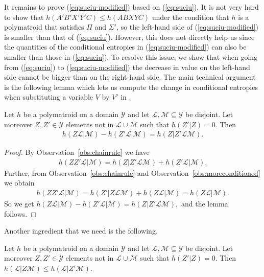 \documentclass[a4paper,cleveref]{lipics-v2021}
\newcommand{\vset}[1]{\mathcal{#1}}
\begin{document}
It remains to prove (\ref{eq:suciu-modified}) based on  (\ref{eq:suciu}). 
It is not very hard to show that $h(A'B'X'Y'C)\le h(ABXYC)$ under the condition that $h$ is a polymatroid that satisfies $\Pi$ and $\Sigma'$, so the left-hand side of (\ref{eq:suciu-modified}) is smaller than that of (\ref{eq:suciu}). 
However, this does not directly help us since the quantities of the conditional entropies in (\ref{eq:suciu-modified}) can also be smaller than those in (\ref{eq:suciu}). 
To resolve this issue, we show that when going from (\ref{eq:suciu}) to (\ref{eq:suciu-modified}) the decrease in  value on the left-hand side cannot be bigger than on the right-hand side.  
The main technical argument is the following lemma which lets us compute the change in conditional entropies when substituting a variable $V$ by $V'$ in .


\begin{lemma}\label{lem:Atoa}
	Let $h$ be a polymatroid on a domain $\vset Y$ and let $\vset L, \vset M\subseteq \vset Y$ be disjoint. 
	Let moreover $Z, Z'\in \vset Y$ elements not in $\vset L\cup \vset M$ such that $h(Z'|Z) = 0$. Then 
	\begin{align*}
	h(Z\vset L|\vset M) - h(Z'\vset L|\vset M) = h(Z |  Z' \vset L\vset M ).
	\end{align*}
\end{lemma}

%
%
%
%
%
\begin{proof}
	By Observation~\ref{obs:chainrule} %
	we have  
	\begin{align*}
		h(ZZ'\vset L|\vset M) = h(Z|Z' \vset L \vset M ) + h(Z' \vset L | \vset M).
	\end{align*}
	Further, from Observation~\ref{obs:chainrule} and Observation~\ref{obs:moreconditioned} we obtain 
	\begin{align*}
		h(ZZ' \vset L|\vset M) = h(Z'|Z\vset L\vset M) + h(Z\vset L |\vset M) = h(Z\vset L |\vset M).
	\end{align*}
	So we get 
	\(
		h(Z\vset L|\vset M) - h(Z'\vset L|\vset M) = h(Z | Z' \vset L\vset M ),
	\)
	and the lemma follows.
\end{proof}

Another ingredient that we need is the following.

\begin{lemma}\label{lem:Atoa-otherside} Let $h$ be a polymatroid on a domain $\vset Y$ and let $\vset L, \vset M\subseteq \vset Y$ be disjoint. Let moreover $Z, Z'\in \vset Y$ elements not in $\vset L\cup \vset M$ such that $h(Z'|Z) = 0$. Then 
	\(
	h(\vset L|Z \vset M) \le h(\vset L|Z' \vset M).
	\)	
\end{lemma}
\end{document}
